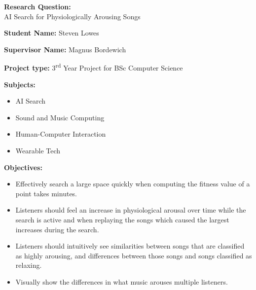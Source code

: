 \documentclass[a4paper,12pt]{article}
\begin{document}
	{\Large\textbf{Research Question:}\\AI Search for Physiologically Arousing Songs}
	
	\textbf{Student Name:} Steven Lowes
	
	\textbf{Supervisor Name:} Magnus Bordewich
	
	\textbf{Project type:} 3\textsuperscript{rd} Year Project for BSc Computer Science
	
	\textbf{Subjects:}
	\begin{itemize}
		\item AI Search
		\item Sound and Music Computing
		\item Human-Computer Interaction
		\item Wearable Tech
	\end{itemize}
	
	\textbf{Objectives:}
	\begin{itemize}
		\item Effectively search a large space quickly when computing the fitness value of a point takes minutes.
		\item Listeners should feel an increase in physiological arousal over time while the search is active and when replaying the songs which caused the largest increases during the search.
		\item Listeners should intuitively see similarities between songs that are classified as highly arousing, and differences between those songs and songs classified as relaxing.
		\item Visually show the differences in what music arouses multiple listeners.
	\end{itemize}
	
\end{document}

